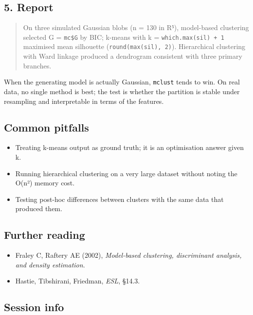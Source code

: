 \documentclass[
]{article}
\providecommand{\tightlist}{%
  \setlength{\itemsep}{0pt}\setlength{\parskip}{0pt}}
\begin{document}
\subsection{5. Report}\label{report}

\begin{quote}
On three simulated Gaussian blobs (n = 130 in R⁵), model-based
clustering selected G = \texttt{mc\$G} by BIC; k-means with k =
\texttt{which.max(sil)\ +\ 1} maximised mean silhouette
(\texttt{round(max(sil),\ 2)}). Hierarchical clustering with Ward
linkage produced a dendrogram consistent with three primary branches.
\end{quote}

When the generating model is actually Gaussian, \texttt{mclust} tends to
win. On real data, no single method is best; the test is whether the
partition is stable under resampling and interpretable in terms of the
features.

\subsection{Common pitfalls}\label{common-pitfalls}

\begin{itemize}
\tightlist
\item
  Treating k-means output as ground truth; it is an optimisation answer
  given k.
\item
  Running hierarchical clustering on a very large dataset without noting
  the O(n²) memory cost.
\item
  Testing post-hoc differences between clusters with the same data that
  produced them.
\end{itemize}

\subsection{Further reading}\label{further-reading}

\begin{itemize}
\tightlist
\item
  Fraley C, Raftery AE (2002), \emph{Model-based clustering,
  discriminant analysis, and density estimation}.
\item
  Hastie, Tibshirani, Friedman, \emph{ESL}, §14.3.
\end{itemize}

\subsection{Session info}\label{session-info}
\end{document}
